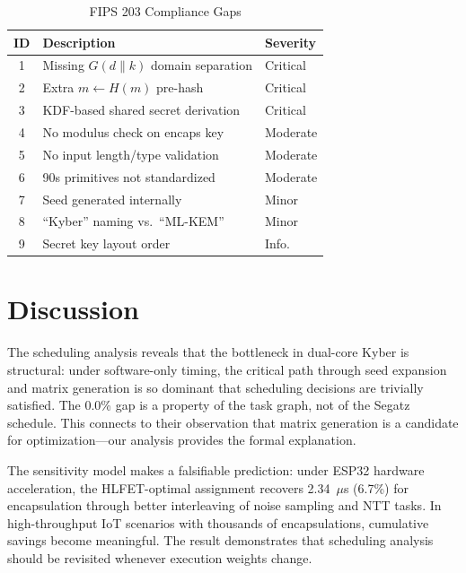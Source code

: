 \documentclass[conference]{IEEEtran}
\begin{document}
\begin{table}[!t]
\renewcommand{\arraystretch}{1.1}
\caption{FIPS 203 Compliance Gaps}
\label{tab:fips_gaps}
\centering
\begin{tabular}{c l l}
\toprule
\textbf{ID} & \textbf{Description} & \textbf{Severity} \\
\midrule
1 & Missing $G(d \| k)$ domain separation & Critical \\
2 & Extra $m \leftarrow H(m)$ pre-hash & Critical \\
3 & KDF-based shared secret derivation & Critical \\
4 & No modulus check on encaps key & Moderate \\
5 & No input length/type validation & Moderate \\
6 & 90s primitives not standardized & Moderate \\
7 & Seed generated internally & Minor \\
8 & ``Kyber'' naming vs.\ ``ML-KEM'' & Minor \\
9 & Secret key layout order & Info. \\
\bottomrule
\end{tabular}
\end{table}

\section{Discussion}

The scheduling analysis reveals that the bottleneck in dual-core Kyber is structural: under software-only timing, the critical path through seed expansion and matrix generation is so dominant that scheduling decisions are trivially satisfied. The 0.0\% gap is a property of the task graph, not of the Segatz schedule. This connects to their observation that matrix generation is a candidate for optimization---our analysis provides the formal explanation.

The sensitivity model makes a falsifiable prediction: under ESP32 hardware acceleration, the HLFET-optimal assignment recovers 2.34~$\mu$s (6.7\%) for encapsulation through better interleaving of noise sampling and NTT tasks. In high-throughput IoT scenarios with thousands of encapsulations, cumulative savings become meaningful. The result demonstrates that scheduling analysis should be revisited whenever execution weights change.
\end{document}
